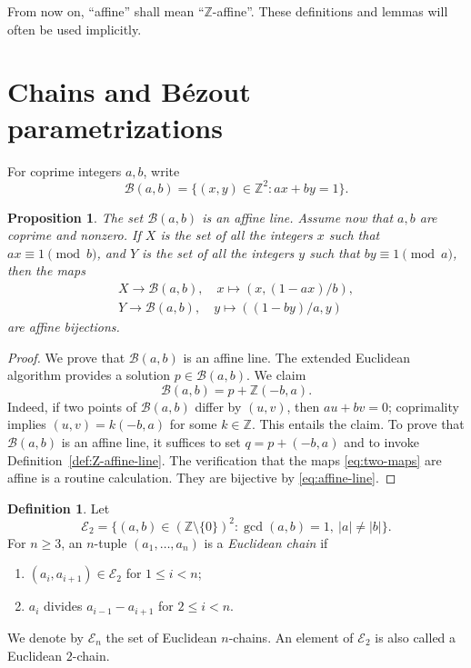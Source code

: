 \documentclass[12pt,letterpaper]{article}
\numberwithin{equation}{section}
\newcommand{\Z}{\mathbb Z}
\newcommand{\B}{\mathcal B}
\newcommand{\E}{\mathcal E}
\theoremstyle{plain}
\newtheorem{proposition}[theorem]{Proposition}
\theoremstyle{definition}
\newtheorem{definition}[theorem]{Definition}
\begin{document}
From now on, ``affine'' shall mean ``$\Z$-affine''. These definitions and lemmas will often be used implicitly.

\section{Chains and Bézout parametrizations}

For coprime integers $a,b$, write
\begin{equation}\label{eq:Bab}
  \B(a,b)=\{(x,y)\in\Z^2: ax+by=1\}.
\end{equation}

\begin{proposition}\label{prop:affine-line}
The set $\B(a,b)$ is an affine line. Assume now that $a,b$ are coprime and \emph{nonzero}. If $X$ is the set of all the integers $x$ such that $ax\equiv1\pmod b$, and $Y$ is the set of all the integers $y$ such that $by\equiv1\pmod a$, then the maps 
\begin{equation}\label{eq:two-maps}
 \begin{aligned}
 X\to \B(a,b),\quad x\mapsto(x,(1-ax)/b),\\
 Y\to \B(a,b),\quad y\mapsto((1-by)/a,y)
 \end{aligned}
\end{equation}
are affine bijections. 
\end{proposition}

\begin{proof}
We prove that $\B(a,b)$ is an affine line. The extended Euclidean algorithm provides a solution $p\in\B(a,b)$. We claim 
\begin{equation}\label{eq:affine-line}
 \B(a,b)=p+\Z(-b,a).
\end{equation}
Indeed, if two points of $\B(a,b)$ differ by $(u,v)$, then $au+bv=0$; coprimality implies $(u,v)=k(-b,a)$ for some $k\in\Z$. This entails the claim. To prove that $\B(a,b)$ is an affine line, it suffices to set $q=p+(-b,a)$ and to invoke Definition~\ref{def:Z-affine-line}. The verification that the maps \eqref{eq:two-maps} are affine is a routine calculation. They are bijective by \eqref{eq:affine-line}.
\end{proof} 

\begin{definition}\label{def:EuclChain}
Let
\[
 \E_2=\{(a,b)\in(\Z\setminus\{0\})^2:
          \gcd(a,b)=1,\ |a|\ne |b|\}.
\]
For $n\geq 3$, an $n$-tuple $(a_1,\ldots,a_n)$ is a \emph{Euclidean chain} if
\begin{enumerate}[label=(\roman*),leftmargin=2.2em]
  \item $(a_i,a_{i+1})\in\E_2$ for $1\leq i<n$;
  \item $a_i$ divides $a_{i-1}-a_{i+1}$ for $2\leq i<n$.
\end{enumerate}
We denote by $\E_n$ the set of Euclidean $n$-chains. An element of $\E_2$ is also called a Euclidean $2$-chain.
\end{definition}
\end{document}
